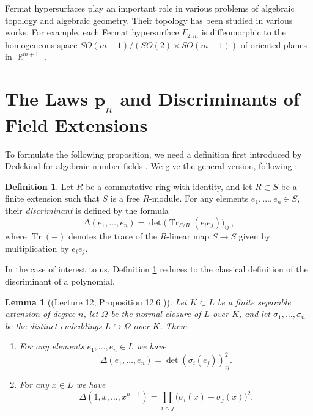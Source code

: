 \documentclass[14pt, dvipsnames]{extarticle}
\theoremstyle{plain}
\newtheorem{lemma}{Lemma}
\theoremstyle{definition}
\newtheorem{defi}{Definition}
\theoremstyle{remark}
\DeclareMathOperator{\R}{\mathbb{R}}
\DeclareMathOperator{\Tr}{\mathrm{Tr}}
\begin{document}
Fermat hypersurfaces play an important role in various problems of algebraic topology and algebraic geometry. Their topology has been studied in various works. For example, each Fermat hypersurface $F_{2, m}$ is diffeomorphic to the homogeneous space $SO(m+1)/(SO(2)\times SO(m-1))$ of oriented planes in $\R^{m + 1}$ \cite[Chapter XI, Example 10.6]{Kobayashi_2}.    











\section
[The Laws $\texorpdfstring{\bm{p}_n}{p_n}$ and Discriminants of Field Extensions]
{The Laws $\bm{p}_n$ and Discriminants of Field Extensions}
\label{p_n_laws_and_field_extension_discriminants}

To formulate the following proposition, we need a definition first introduced by Dedekind for algebraic number fields \cite[p.~429]{Dedekind}. We give the general version, following \cite[Lecture 12, Definition 12.5]{number_theory_lectures}:

\begin{defi}\label{discriminant_for_field_extensions}
Let $R$ be a commutative ring with identity, and let $R\subset S$ be a finite extension such that $S$ is a free $R$-module. For any elements $e_1,\dots,e_n\in S$, their {\it discriminant} is defined by the formula
\[
\Delta(e_1,\dots,e_n)=\det\bigl(\Tr_{S/R}(e_ie_j)\bigr)_{ij}\,,
\]
where $\Tr(-)$ denotes the trace of the $R$-linear map $S\to S$ given by multiplication by $e_ie_j$.
\end{defi}

In the case of interest to us, Definition \ref{discriminant_for_field_extensions} reduces to the classical definition of the discriminant of a polynomial.

\begin{lemma}[(Lecture 12, Proposition 12.6 \cite{number_theory_lectures})]
Let $K\subset L$ be a finite separable extension of degree $n$, let $\Omega$ be the normal closure of $L$ over $K$, and let $\sigma_1,\dots,\sigma_n$ be the distinct embeddings $L\hookrightarrow \Omega$ over $K$. Then:
\begin{enumerate}[\bf (i)]
\item For any elements $e_1,\dots,e_n\in L$ we have
$$\Delta(e_1,\dots,e_n)=\det(\sigma_i(e_j))_{ij}^{2}.$$
\item For any $x\in L$ we have
$$\Delta(1,x,\dots,x^{n-1})=\prod_{i<j}\bigl(\sigma_i(x)-\sigma_j(x)\bigr)^{2}.$$
\end{enumerate}
\end{lemma}
\end{document}
